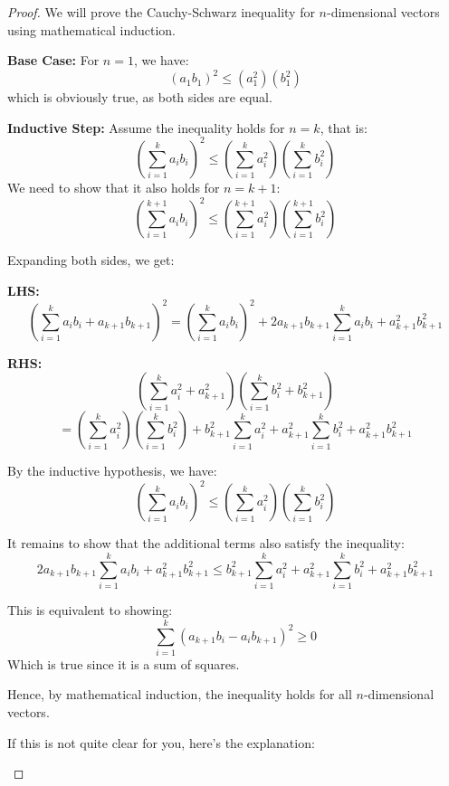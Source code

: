 \documentclass[
	12pt, %
	fleqn, %
	a4paper, %
]{LegrandOrangeBook}
\begin{document}
\begin{proof}
    We will prove the Cauchy-Schwarz inequality for \( n \)-dimensional vectors using mathematical induction.

\textbf{Base Case:} For \( n = 1 \), we have:
\[
(a_1b_1)^2 \leq (a_1^2)(b_1^2)
\]
which is obviously true, as both sides are equal.

\textbf{Inductive Step:}
Assume the inequality holds for \( n = k \), that is:
\[
\left(\sum_{i=1}^{k} a_ib_i\right)^2 \leq \left(\sum_{i=1}^{k} a_i^2\right)\left(\sum_{i=1}^{k} b_i^2\right)
\]
We need to show that it also holds for \( n = k+1 \):
\[
\left(\sum_{i=1}^{k+1} a_ib_i\right)^2 \leq \left(\sum_{i=1}^{k+1} a_i^2\right)\left(\sum_{i=1}^{k+1} b_i^2\right)
\]

Expanding both sides, we get:

\textbf{LHS:}
\[
\left(\sum_{i=1}^{k} a_ib_i + a_{k+1}b_{k+1}\right)^2 = \left(\sum_{i=1}^{k} a_ib_i\right)^2 + 2a_{k+1}b_{k+1}\sum_{i=1}^{k} a_ib_i + a_{k+1}^2b_{k+1}^2
\]

\textbf{RHS:}
\[
\left(\sum_{i=1}^{k} a_i^2 + a_{k+1}^2\right)\left(\sum_{i=1}^{k} b_i^2 + b_{k+1}^2\right)
\]
\[
= \left(\sum_{i=1}^{k} a_i^2\right)\left(\sum_{i=1}^{k} b_i^2\right) + b_{k+1}^2\sum_{i=1}^{k} a_i^2 + a_{k+1}^2\sum_{i=1}^{k} b_i^2 + a_{k+1}^2b_{k+1}^2
\]

By the inductive hypothesis, we have:
\[
\left(\sum_{i=1}^{k} a_ib_i\right)^2 \leq \left(\sum_{i=1}^{k} a_i^2\right)\left(\sum_{i=1}^{k} b_i^2\right)
\]

It remains to show that the additional terms also satisfy the inequality:
\[
2a_{k+1}b_{k+1}\sum_{i=1}^{k} a_ib_i + a_{k+1}^2b_{k+1}^2 \leq b_{k+1}^2\sum_{i=1}^{k} a_i^2 + a_{k+1}^2\sum_{i=1}^{k} b_i^2 + a_{k+1}^2b_{k+1}^2
\]

This is equivalent to showing:
\[
\sum_{i=1}^{k} (a_{k+1}b_i - a_ib_{k+1})^2 \geq 0
\]
Which is true since it is a sum of squares.

\noindent Hence, by mathematical induction, the inequality holds for all \( n \)-dimensional vectors.
\begin{remark}
    If this is not quite clear for you, here's the explanation: 


\end{remark}
\end{proof}
\end{document}
